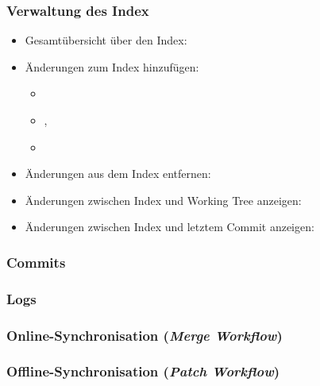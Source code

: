 \documentclass{cms-kurs}
\begin{document}
\begin{frame}
  \frametitle{Verwaltung des Index}

  \onslide<+->

  \begin{itemize}
  \item Gesamtübersicht über den Index: 
  \item Änderungen zum Index hinzufügen:
    \begin{itemize}
    \item {}
    \item {}, 
    \item {}
    \end{itemize}
  \item Änderungen aus dem Index entfernen: 
  \item Änderungen zwischen Index und Working Tree anzeigen: 
  \item Änderungen zwischen Index und letztem Commit anzeigen: 
  \end{itemize}

\end{frame}

\begin{frame}
  \frametitle{Commits}

  \onslide<+->


\end{frame}

\begin{frame}
  \frametitle{Logs}

  \onslide<+->


\end{frame}

\begin{frame}
  \frametitle{Online-Synchronisation (\emph{Merge Workflow})}

  \onslide<+->


\end{frame}

\begin{frame}
  \frametitle{Offline-Synchronisation (\emph{Patch Workflow})}

  \onslide<+->


\end{frame}
\end{document}
